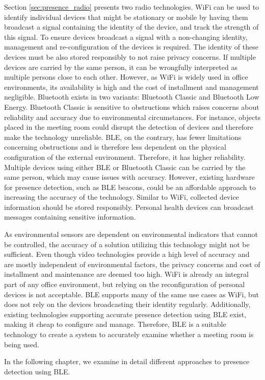 Section \ref{sec:presence_radio} presents two radio technologies. 
WiFi can be used to identify individual devices that might be stationary or mobile by having them broadcast a signal containing the identity of the device, and track the strength of this signal.
To ensure devices broadcast a signal with a non-changing identity, management and re-configuration of the devices is required.
The identity of these devices must be also stored responsibly to not raise privacy concerns.
If multiple devices are carried by the same person, it can be wrongfully interpreted as multiple persons close to each other. 
However, as WiFi is widely used in office environments, its availability is high and the cost of installment and management negligible.
Bluetooth exists in two variants: Bluetooth Classic and Bluetooth Low Energy.
Bluetooth Classic is sensitive to obstructions which raises concerns about reliability and accuracy due to environmental circumstances. 
For instance, objects placed in the meeting room could disrupt the detection of devices and therefore make the technology unreliable.
BLE, on the contrary, has fewer limitations concerning obstructions and is therefore less dependent on the physical configuration of the external environment. 
Therefore, it has higher reliability.
Multiple devices using either BLE or Bluetooth Classic can be carried by the same person, which may cause issues with accuracy.
However, existing hardware for presence detection, such as BLE beacons, could be an affordable approach to increasing the accuracy of the technology.  
Similar to WiFi, collected device information should be stored responsibly.
Personal health devices can broadcast messages containing sensitive information.

As environmental sensors are dependent on environmental indicators that cannot be controlled, the accuracy of a solution utilizing this technology might not be sufficient.
Even though video technologies provide a high level of accuracy and are mostly independent of environmental factors, the privacy concerns and cost of installment and maintenance are deemed too high.
WiFi is already an integral part of any office environment, but relying on the reconfiguration of personal devices is not acceptable. 
BLE supports many of the same use cases as WiFi, but does not rely on the devices broadcasting their identity regularly.
Additionally, existing technologies supporting accurate presence detection using BLE exist, making it cheap to configure and manage. 
Therefore, BLE is a suitable technology to create a system to accurately examine whether a meeting room is being used.

In the following chapter, we examine in detail different approaches to presence detection using BLE.